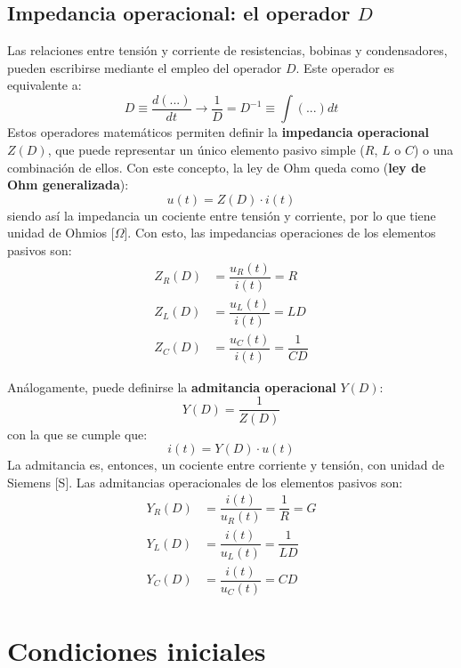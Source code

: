 \subsection{Impedancia operacional: el operador $D$
}\label{sec.operador_D}
Las relaciones entre tensión y corriente de resistencias, bobinas y
condensadores, pueden escribirse mediante el empleo del operador
$D$. Este operador es equivalente a:
\begin{equation*}
  D\equiv \dfrac{d(...)}{dt} \rightarrow \dfrac{1}{D}=D^{-1}\equiv \int (...) dt
\end{equation*}
Estos operadores matemáticos permiten definir la \textbf{impedancia
  operacional} $Z(D)$, que puede representar un único elemento pasivo
simple ($R$, $L$ o $C$) o una combinación de ellos. Con este concepto,
la ley de Ohm queda como (\textbf{ley de Ohm generalizada}):
\begin{equation*}
  u(t)=Z(D)\cdot i(t)
\end{equation*}
siendo así la impedancia un cociente entre tensión y corriente, por lo
que tiene unidad de Ohmios [$\Omega$].  Con esto, las impedancias
operaciones de los elementos pasivos son:
\begin{align*}
  Z_R(D)&=\dfrac{u_R(t)}{i(t)}=R\\
  Z_L(D)&=\dfrac{u_L(t)}{i(t)}=LD\\
  Z_C(D)&=\dfrac{u_C(t)}{i(t)}=\dfrac{1}{CD}
\end{align*}
	
Análogamente, puede definirse la \textbf{admitancia operacional}
$Y(D)$:
\begin{equation*}
  Y(D)=\dfrac{1}{Z(D)}
\end{equation*}
con la que se cumple que:
\begin{equation*}
  i(t)=Y(D)\cdot u(t)
\end{equation*}
La admitancia es, entonces, un cociente entre corriente y tensión, con
unidad de Siemens [S]. Las admitancias operacionales de los elementos
pasivos son:
\begin{align*}
  Y_R(D)&=\dfrac{i(t)}{u_R(t)}=\dfrac{1}{R}=G\\
  Y_L(D)&=\dfrac{i(t)}{u_L(t)}=\dfrac{1}{LD}\\
  Y_C(D)&=\dfrac{i(t)}{u_C(t)}=CD
\end{align*} 

\section{Condiciones iniciales}\label{sec.condiciones_iniciales}
	
